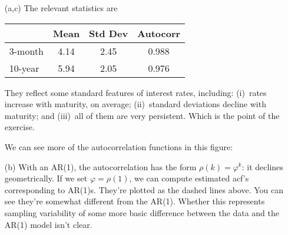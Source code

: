 \documentclass[11pt]{exam}
\begin{document}
\begin{questions}

\begin{solution}
\begin{enumerate}
\item [(a,c)]
The relevant statistics are

\begin{center}
\begin{tabular}{lccc}
\toprule
        &  Mean & Std Dev & Autocorr \\
\midrule
3-month  &   4.14 & 2.45 & 0.988  \\
10-year  &   5.94 & 2.05 & 0.976  \\
\bottomrule
\end{tabular}
\end{center}

They reflect some standard features of interest rates, including:
(i)~rates increase with maturity, on average;
(ii)~standard deviations decline with maturity;
and (iii)~all of them are very persistent.
Which is the point of the exercise.

We can see more of the autocorrelation functions in this figure:
\begin{center}
\end{center}

\item[(b)] With an AR(1), the autocorrelation has the form
$\rho(k) = \varphi^k$:  it declines geometrically.
If we set $\varphi = \rho(1)$, we can compute
estimated acf's corresponding to AR(1)s.
They're plotted as the dashed lines above.
You can see they're somewhat different from the AR(1).
Whether this represents sampling variability of some more
basic difference between the data and the AR(1) model isn't clear.


\end{enumerate}
\end{solution}


\end{questions}
\end{document}
